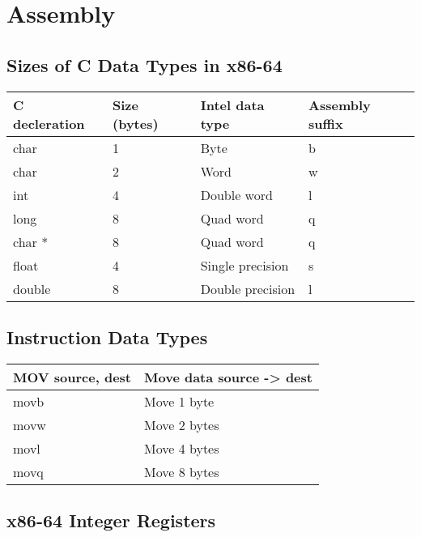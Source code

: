 \section*{Assembly}

\subsection*{Sizes of C Data Types in x86-64}

\begin{tabular}{| l | l | l | l |}
    \hline
    C decleration & Size (bytes) & Intel data type & Assembly suffix \\
    \hline
    char & 1 & Byte & b \\
    char & 2 & Word & w \\
    int & 4 & Double word & l \\
    long & 8 & Quad word & q \\
    char * & 8 & Quad word & q \\
    float & 4 & Single precision & s \\
    double & 8 & Double precision & l \\
    \hline
\end{tabular}

\subsection*{Instruction Data Types}


\begin{tabular}{| l | l |}
    \hline
    MOV source, dest & Move data source -> dest \\
    \hline
    movb & Move 1 byte \\
    movw & Move 2 bytes \\
    movl & Move 4 bytes \\
    movq & Move 8 bytes \\
    \hline
\end{tabular}

\subsection*{x86-64 Integer Registers}

